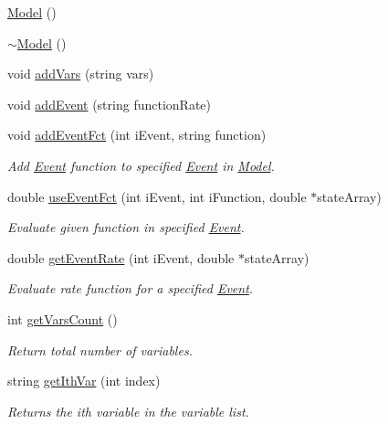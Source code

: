 \begin{DoxyCompactItemize}
\item 
\hyperlink{class_model_ae3b375de5f6df4faf74a95d64748e048}{Model} ()
\item 
\hyperlink{class_model_ad6ebd2062a0b823db841a0b88baac4c0}{$\sim$\+Model} ()
\item 
void \hyperlink{class_model_a4743b4f267eeb1a60e21cc2995e1efcd}{add\+Vars} (string vars)
\item 
void \hyperlink{class_model_ab6f784e4ff8cdf3ee5e010ef4dd8d597}{add\+Event} (string function\+Rate)
\item 
void \hyperlink{class_model_a78d9b07bd5e819215c9aeefabb4cede7}{add\+Event\+Fct} (int i\+Event, string function)
\begin{DoxyCompactList}\small\item\em Add \hyperlink{class_event}{Event} function to specified \hyperlink{class_event}{Event} in \hyperlink{class_model}{Model}. \end{DoxyCompactList}\item 
double \hyperlink{class_model_a774d9fb034f8704a75d7b3568a87a3bc}{use\+Event\+Fct} (int i\+Event, int i\+Function, double $\ast$state\+Array)
\begin{DoxyCompactList}\small\item\em Evaluate given function in specified \hyperlink{class_event}{Event}. \end{DoxyCompactList}\item 
double \hyperlink{class_model_a2909caddddccca90faaae708e68226ad}{get\+Event\+Rate} (int i\+Event, double $\ast$state\+Array)
\begin{DoxyCompactList}\small\item\em Evaluate rate function for a specified \hyperlink{class_event}{Event}. \end{DoxyCompactList}\item 
int \hyperlink{class_model_ae8b56a284c355ff18421174d078dc870}{get\+Vars\+Count} ()
\begin{DoxyCompactList}\small\item\em Return total number of variables. \end{DoxyCompactList}\item 
string \hyperlink{class_model_adcb9dcc2d1d58f18d595f1476fc77b3b}{get\+Ith\+Var} (int index)
\begin{DoxyCompactList}\small\item\em Returns the ith variable in the variable list. \end{DoxyCompactList}\item 

\end{DoxyCompactItemize}
